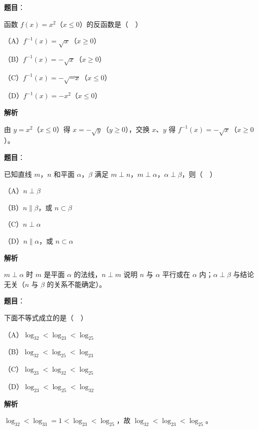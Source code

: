 \begin{answer}

\textbf{题目}：

函数 $f(x)=x^2$（$x\leqslant0$）的反函数是（　）

（A）$f^{-1}(x)=\sqrt x$（$x\geqslant0$）

（B）$f^{-1}(x)=-\sqrt x$（$x\geqslant0$）

（C）$f^{-1}(x)=-\sqrt{-x}$（$x\leqslant0$）

（D）$f^{-1}(x)=-x^2$（$x\leqslant0$）

\textbf{解析}

由 $y=x^2$（$x\leqslant0$）得 $x=-\sqrt y$（$y\geqslant0$），交换 $x$、$y$ 得 $f^{-1}(x)=-\sqrt x$（$x\geqslant0$）。


\end{answer}
\begin{answer}

\textbf{题目}：

已知直线 $m$，$n$ 和平面 $\alpha$，$\beta$ 满足 $m\perp n$，$m\perp\alpha$，$\alpha\perp\beta$，则（　）

（A）$n\perp\beta$

（B）$n\parallel\beta$，或 $n\subset\beta$

（C）$n\perp\alpha$

（D）$n\parallel\alpha$，或 $n\subset\alpha$

\textbf{解析}

$m\perp\alpha$ 时 $m$ 是平面 $\alpha$ 的法线，$n\perp m$ 说明 $n$ 与 $\alpha$ 平行或在 $\alpha$ 内；$\alpha\perp\beta$ 与结论无关（$n$ 与 $\beta$ 的关系不能确定）。


\end{answer}
\begin{answer}

\textbf{题目}：

下面不等式成立的是（　）

（A）$\log_32<\log_23<\log_25$

（B）$\log_32<\log_25<\log_23$

（C）$\log_23<\log_32<\log_25$

（D）$\log_23<\log_25<\log_32$

\textbf{解析}

$\log_32<\log_33=1<\log_23<\log_25$，故 $\log_32<\log_23<\log_25$。


\end{answer}
